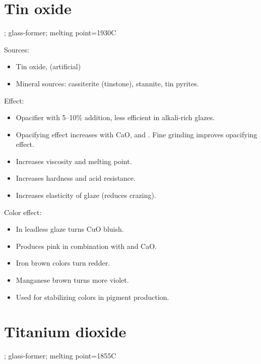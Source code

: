 \section{Tin oxide}
; glass-former; melting point=1930\degree C

Sources:
\begin{itemize}
  \item Tin oxide,  (artificial)
  \item Mineral sources: cassiterite (tinstone), stannite, tin pyrites.
\end{itemize}
Effect:
\begin{itemize}
  \item Opacifier with 5--10\% addition, less efficient in alkali-rich glazes.
  \item Opacifying effect increases with CaO,  and . Fine 
  grinding improves opacifying effect.
  \item Increases viscosity and melting point.
  \item Increases hardness and acid resistance.
  \item Increases elasticity of glaze (reduces crazing).
\end{itemize}
Color effect:
\begin{itemize}
  \item In leadless glaze turns CuO bluish.
  \item Produces pink in combination with  and CaO.
  \item Iron brown colors turn redder.
  \item Manganese brown turns more violet.
  \item Used for stabilizing colors in pigment production.
\end{itemize}
\section{Titanium dioxide}
; glass-former; melting point=1855\degree C

